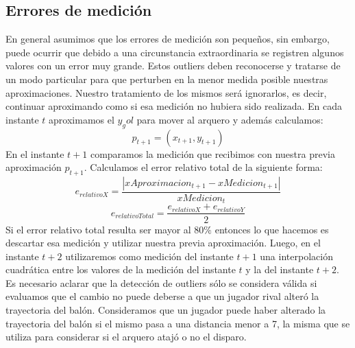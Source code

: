 \subsection{Errores de medición}\label{ssec:errores_de_medicion}
En general asumimos que los errores de medición son pequeños, sin embargo, puede ocurrir que debido a una circunstancia extraordinaria
se registren algunos valores con un error muy grande. Estos outliers deben reconocerse y tratarse de un modo particular para que perturben en
la menor medida posible nuestras aproximaciones. Nuestro 
tratamiento de los mismos será ignorarlos, es decir, continuar aproximando como si esa medición no hubiera sido realizada.  En cada instante $t$ 
aproximamos el $y_gol$ para mover al arquero y además calculamos: 
\begin{displaymath}
	p_{t+1} = (x_{t+1}, y_{t+1})
\end{displaymath}
En el instante $t+1$ comparamos la medición que recibimos con nuestra previa aproximación $p_{t+1}$. Calculamos el error relativo total de la siguiente
forma:
\begin{displaymath}
	e_{relativoX} = \frac{|xAproximacion_{t+1} - xMedicion_{t+1}|}{xMedicion_{t}}
\end{displaymath}
\begin{displaymath}
	e_{relativoTotal} = \frac{e_{relativoX} + e_{relativoY}}{2}
\end{displaymath}
Si el error relativo total resulta ser mayor al $80\%$ entonces lo que hacemos es descartar esa medición y utilizar nuestra previa aproximación. Luego,
en el instante $t+2$ utilizaremos como medición del instante $t+1$ una interpolación cuadrática entre los valores de la medición del instante $t$ y 
la del instante $t+2$. Es necesario aclarar que la detección de outliers sólo se considera válida si evaluamos que el cambio no puede deberse a que un jugador rival
alteró la trayectoria del balón. Consideramos que un jugador puede haber alterado la trayectoria del balón si el mismo pasa a una distancia menor a 7, la misma
que se utiliza para considerar si el arquero atajó o no el disparo.

